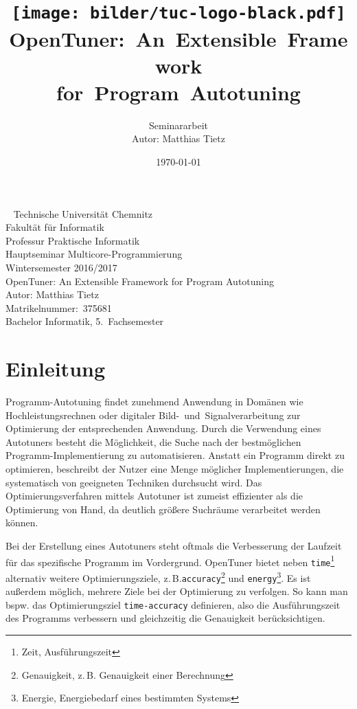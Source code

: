 \documentclass[a4paper,11pt]{scrartcl}
\title{\texttt{[image: bilder/tuc-logo-black.pdf]}
    OpenTuner:~An~Extensible~Framework\\for~Program~Autotuning
}
\author{Seminararbeit\\Autor: Matthias Tietz}
\date{\today}
\newcommand{\zB}{\mbox{z.\,B.}\xspace}
\begin{document}
\maketitle \thispagestyle{empty} \newpage

\thispagestyle{empty}
~
\vfill
Technische Universität Chemnitz\\
Fakultät für Informatik\\
Professur Praktische Informatik\\
Hauptseminar Multicore-Programmierung\\
Wintersemester 2016/2017\\

OpenTuner: An Extensible Framework for Program Autotuning\\
Autor: Matthias Tietz\\
Matrikelnummer:~375681\\
Bachelor Informatik, 5.~Fachsemester

\newpage
\tableofcontents \newpage



\section{Einleitung}

Programm-Autotuning findet zunehmend Anwendung in Domänen wie Hochleistungsrechnen oder
digitaler Bild-~und~Signalverarbeitung zur Optimierung der entsprechenden Anwendung.
Durch die Verwendung eines Autotuners besteht die Möglichkeit, die Suche nach der
bestmöglichen Programm-Implementierung zu automatisieren. Anstatt ein Programm direkt
zu optimieren, beschreibt der Nutzer eine Menge möglicher Implementierungen, die 
systematisch von geeigneten Techniken durchsucht wird. Das Optimierungsverfahren
mittels Autotuner ist zumeist effizienter als die Optimierung von Hand, da deutlich größere
Suchräume verarbeitet werden können. \newline

Bei der Erstellung eines Autotuners steht oftmals die Verbesserung der Laufzeit
für das spezifische Programm im Vordergrund. OpenTuner bietet neben \texttt{time}\footnote{Zeit, Ausführungszeit}  
alternativ weitere Optimierungsziele, \zB \texttt{accuracy}\footnote{Genauigkeit, \zB Genauigkeit einer Berechnung}  
und \texttt{energy}\footnote{Energie, Energiebedarf eines bestimmten Systems}.
Es ist außerdem möglich, mehrere Ziele bei der Optimierung zu verfolgen. 
So kann man bspw. das Optimierungsziel \texttt{time-accuracy} definieren, also die Ausführungszeit
des Programms verbessern und gleichzeitig die Genauigkeit berücksichtigen. \newline
\end{document}
